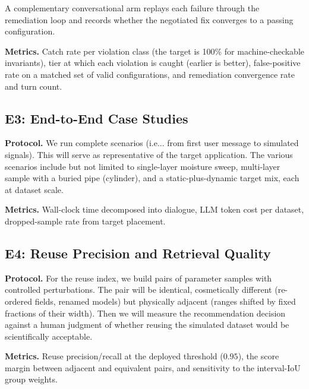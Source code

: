 \documentclass[journal]{IEEEtran}
\begin{document}
A complementary conversational arm replays each failure through the remediation loop and records whether the negotiated fix converges to a passing configuration.

\textbf{Metrics.} Catch rate per violation class (the target is 100\% for machine-checkable invariants), tier at which each violation is caught (earlier is better), false-positive rate on a matched set of valid configurations, and remediation convergence rate and turn count.


\subsection{E3: End-to-End Case Studies}
\label{sec:eval-e2e}

\textbf{Protocol.} We run complete scenarios (i.e... from first user message to simulated signals). This will serve as representative of the target application. The various scenarios include but not limited to single-layer moisture sweep, multi-layer sample with a buried pipe (cylinder), and a static-plus-dynamic target mix, each at dataset scale. %

\textbf{Metrics.} Wall-clock time decomposed into dialogue, LLM token cost per dataset, dropped-sample rate from target placement.

\subsection{E4: Reuse Precision and Retrieval Quality}
\label{sec:eval-reuse}

\textbf{Protocol.} For the reuse index, we build pairs of parameter samples with controlled perturbations. The pair will be identical, cosmetically different (re-ordered fields, renamed models) but physically adjacent (ranges shifted by fixed fractions of their width). Then we will  measure the recommendation decision against a human judgment of whether reusing the simulated dataset would be scientifically acceptable. 

\textbf{Metrics.} Reuse precision/recall at the deployed threshold ($0.95$), the score margin between adjacent and equivalent pairs, and sensitivity to the interval-IoU group weights.

\end{document}
